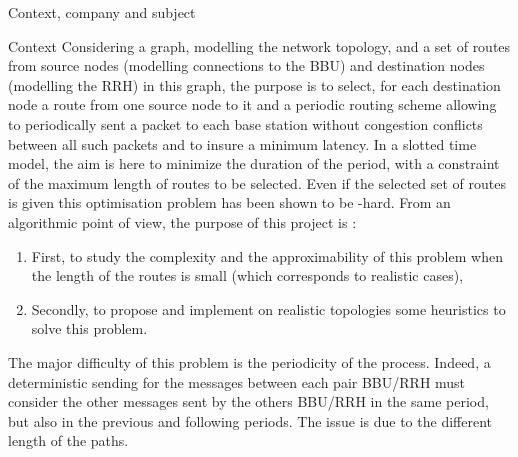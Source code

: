 \documentclass[a4paper,10pt]{report}
\begin{document}
\begin{chapter}{Context, company and subject}
\begin{section}{Context}
Considering a graph, modelling the network topology, and a set of routes from source nodes (modelling connections to the BBU) and destination 
nodes (modelling the RRH) in this graph, the purpose is to select, for each destination node a route from one source node to it and a periodic 
routing scheme allowing to periodically sent a packet to each base station without congestion conflicts between all such packets and to insure a minimum latency. In a slotted time model, the aim is here to minimize the duration of the period, with a constraint of the maximum length of routes to be
selected. Even if the selected set of routes is given this optimisation problem has been shown to be  \NP-hard. From an algorithmic point of view,
the purpose of this project is :
\begin{enumerate}
 \item First, to study the complexity and the approximability of this problem when the length of the routes is small
(which corresponds to realistic cases),
\item Secondly, to propose and implement on realistic topologies some 
heuristics to solve this problem.
\end{enumerate}

The major difficulty of this problem is the periodicity of the process. Indeed, a deterministic sending for the messages
between each pair BBU/RRH must consider the other messages sent by the others BBU/RRH in the same period, but also in the previous
and following periods. The issue is due to the different length of the paths.
\end{section}

\end{chapter}
\end{document}
